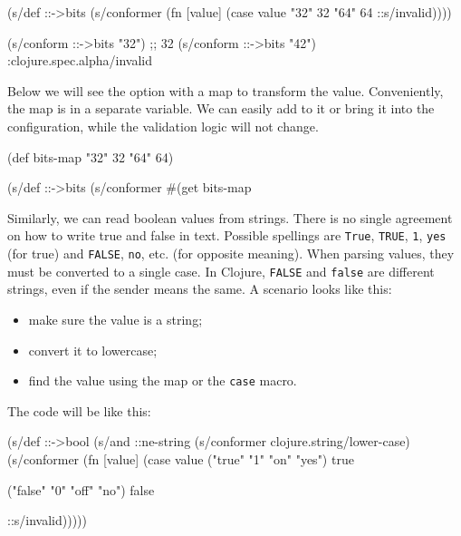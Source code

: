\else

\begin{english}
  \begin{clojure}
(s/def ::->bits
  (s/conformer
   (fn [value]
     (case value
       "32" 32 "64" 64
       ::s/invalid))))

(s/conform ::->bits "32") ;; 32
(s/conform ::->bits "42") :clojure.spec.alpha/invalid
  \end{clojure}
\end{english}

\fi


Below we will see the option with a map to transform the value. Conveniently, the map is in a separate variable. We can easily add to it or bring it into the configuration, while the validation logic will not change.

\begin{english}
  \begin{clojure}
(def bits-map {"32" 32 "64" 64})

(s/def ::->bits
  (s/conformer
   #(get bits-map %
  \end{clojure}
\end{english}

Similarly, we can read boolean values from strings. There is no single agreement on how to write true and false in text. Possible spellings are \verb|True|, \verb|TRUE|, \verb|1|, \verb|yes| (for true) and \verb|FALSE|, \verb|no|, etc. (for opposite meaning). When parsing values, they must be converted to a single case. In Clojure, \verb|FALSE| and \verb|false| are different strings, even if the sender means the same. A scenario looks like this:

\begin{itemize}

\item
  make sure the value is a string;

\item
  convert it to lowercase;

\item
  find the value using the map or the \verb|case| macro.

\end{itemize}

\noindent
The code will be like this:

\ifx\DEVICETYPE\MOBILE

\begin{english}
  \begin{clojure}
(s/def ::->bool
  (s/and
   ::ne-string
   (s/conformer
     clojure.string/lower-case)
   (s/conformer
    (fn [value]
      (case value
        ("true" "1" "on" "yes")
        true

        ("false" "0" "off" "no")
        false

        ::s/invalid)))))

  \end{clojure}
\end{english}

